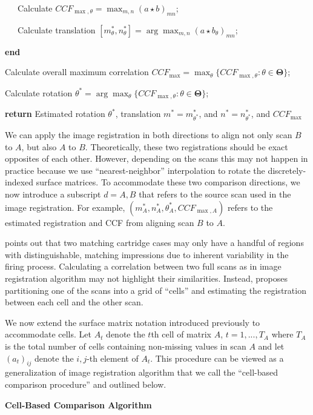 \documentclass[11pt,]{isuthesis}
\begin{document}
~~~Calculate \(CCF_{\max,\theta} = \max_{m,n} (a \star b)_{mn}\);

~~~Calculate translation \([m_{\theta}^*, n_{\theta}^*] = \arg \max_{m,n} (a \star b_\theta)_{mn}\);

\textbf{end}

Calculate overall maximum correlation \(CCF_{\max} = \max_{\theta} \{CCF_{\max, \theta} : \theta \in \pmb{\Theta}\}\);

Calculate rotation \(\theta^* = \arg \max_{\theta} \{CCF_{\max,\theta} : \theta \in \pmb{\Theta}\}\);

\textbf{return} Estimated rotation \(\theta^*\), translation \(m^* = m_{\theta^*}^*\), and \(n^* = n_{\theta^*}^*\), and \(CCF_{\max}\)

We can apply the image registration in both directions to align not only scan \(B\) to \(A\), but also \(A\) to \(B\).
Theoretically, these two registrations should be exact opposites of each other.
However, depending on the scans this may not happen in practice because we use ``nearest-neighbor'' interpolation to rotate the discretely-indexed surface matrices.
To accommodate these two comparison directions, we now introduce a subscript \(d = A,B\) that refers to the source scan used in the image registration.
For example, \((m_A^*, n_A^*, \theta_A^*, CCF_{\max,A})\) refers to the estimated registration and CCF from aligning scan \(B\) to \(A\).

\citet{song_proposed_2013} points out that two matching cartridge cases may only have a handful of regions with distinguishable, matching impressions due to inherent variability in the firing process.
Calculating a correlation between two full scans as in image registration algorithm may not highlight their similarities.
Instead, \citet{song_proposed_2013} proposes partitioning one of the scans into a grid of ``cells'' and estimating the registration between each cell and the other scan.

We now extend the surface matrix notation introduced previously to accommodate cells.
Let \(A_{t}\) denote the \(t\)th cell of matrix \(A\), \(t = 1,...,T_A\) where \(T_A\) is the total number of cells containing non-missing values in scan \(A\) and let \((a_t)_{ij}\) denote the \(i,j\)-th element of \(A_t\).
This procedure can be viewed as a generalization of image registration algorithm that we call the ``cell-based comparison procedure'' and outlined below.

\textbf{Cell-Based Comparison Algorithm}
\end{document}
